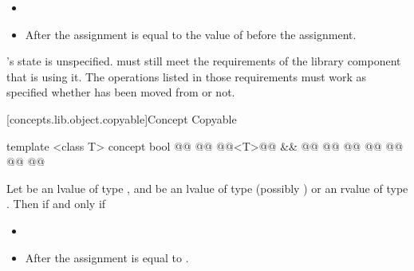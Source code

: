 \begin{addedblock}
\begin{itemdescr}
\begin{itemize}
\item {}
\item After the assignment   is equal to the value
of  before the assignment.
\end{itemize}

\pnum
{}'s  state is unspecified. \enternote {} must still meet the
requirements of the library component that is using it. The operations listed
in those requirements must work as specified whether  has been moved
from or not.\exitnote
\end{itemdescr}

[concepts.lib.object.copyable]{Concept Copyable}

%
\begin{itemdecl}
template <class T>
concept bool @@
  @@
    @@<T>@\newtxt{()}@ &&
    @@
    @@
      @@
      @@
      @@
    @\oldtxt{\};}@
@\newtxt{\}}@
\end{itemdecl}

\begin{itemdescr}
\pnum
Let  be an lvalue of type , and  be an lvalue of type (possibly
)  or an rvalue of type . Then 
  if and only if

\begin{itemize}
\item {}
\item After the assignment   is equal to .
\end{itemize}
\end{itemdescr}


\end{addedblock}
